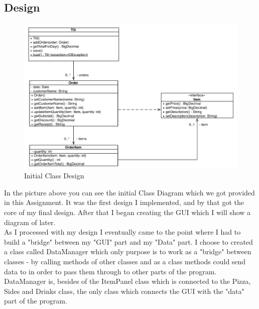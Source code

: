\documentclass[11pt,a4paper]{article}
\begin{document}
\begin{flushleft}
\section{Design}
\begin{figure}[h]
	\centering
 	\includegraphics[width = 1\textwidth]{../Dia/intitialDesign.PNG}  
	\caption{Initial Class Design}
	\label{fig1}
\end{figure}
In the picture above you can see the initial Class Diagram which we got provided in this Assignment. It was the first design I implemented, and by that got the core of my final design.
After that I began creating the GUI which I will show a diagram of later.\\
As I processed with my design I eventually came to the point where I had to build a "bridge" between my "GUI" part and my "Data" part. I choose to created a class called DataManager which only purpose is to work as a "bridge" between classes - by calling methods of other classes and as a class methods could send data to in order to pass them through to other parts of the program. DataManager is, besides of the ItemPanel class which is connected to the Pizza, Sides and Drinks class, the only class which connects the GUI with the "data" part of the program.\\


\end{flushleft}
\end{document}
